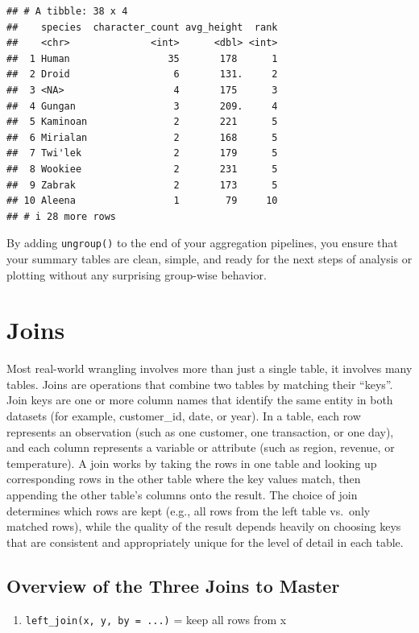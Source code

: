 \documentclass[
  11pt,
]{article}
\providecommand{\tightlist}{%
  \setlength{\itemsep}{0pt}\setlength{\parskip}{0pt}}
\begin{document}
\begin{verbatim}
## # A tibble: 38 x 4
##    species  character_count avg_height  rank
##    <chr>              <int>      <dbl> <int>
##  1 Human                 35       178      1
##  2 Droid                  6       131.     2
##  3 <NA>                   4       175      3
##  4 Gungan                 3       209.     4
##  5 Kaminoan               2       221      5
##  6 Mirialan               2       168      5
##  7 Twi'lek                2       179      5
##  8 Wookiee                2       231      5
##  9 Zabrak                 2       173      5
## 10 Aleena                 1        79     10
## # i 28 more rows
\end{verbatim}

By adding \texttt{ungroup()} to the end of your aggregation pipelines,
you ensure that your summary tables are clean, simple, and ready for the
next steps of analysis or plotting without any surprising group-wise
behavior.

\section{Joins}\label{joins}

Most real-world wrangling involves more than just a single table, it
involves many tables. Joins are operations that combine two tables by
matching their ``keys''. Join keys are one or more column names that
identify the same entity in both datasets (for example, customer\_id,
date, or year). In a table, each row represents an observation (such as
one customer, one transaction, or one day), and each column represents a
variable or attribute (such as region, revenue, or temperature). A join
works by taking the rows in one table and looking up corresponding rows
in the other table where the key values match, then appending the other
table's columns onto the result. The choice of join determines which
rows are kept (e.g., all rows from the left table vs.~only matched
rows), while the quality of the result depends heavily on choosing keys
that are consistent and appropriately unique for the level of detail in
each table.

\subsection{Overview of the Three Joins to
Master}\label{overview-of-the-three-joins-to-master}

\begin{enumerate}
\def\labelenumi{\arabic{enumi}.}
\tightlist
\item
  \texttt{left\_join(x,\ y,\ by\ =\ ...)} = keep all rows from x
\end{enumerate}
\end{document}
